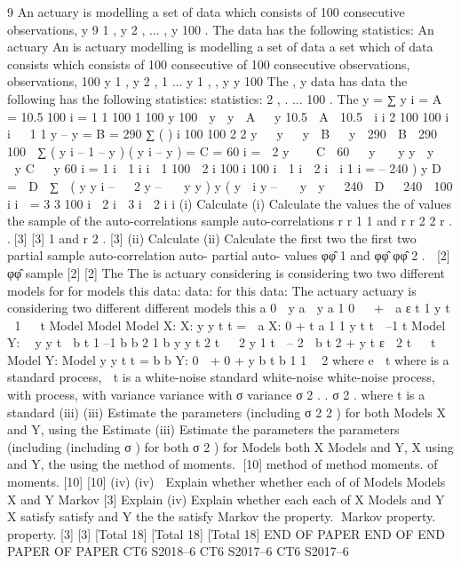 \documentclass[a4paper,12pt]{article}
\begin{document}
\begin{enumerate}
9
An actuary is modelling a set of data which consists of 100 consecutive observations,
y 9 1 , y 2 , ... , y 100 . The data has the following statistics:
An actuary
An is
actuary
modelling is modelling
a set of data
a set which of data consists
which consists of 100 consecutive
of 100 consecutive
observations,
observations,
100
y 1 , y 2 , 1 ... y 1 , , y y 100
The
, y data
has data
the following
has the following
statistics: statistics:
2 , . ...
100 . The
y =
∑ y i = A = 10.5
100 i = 1
1 100 1 100
y 100

y  y 
A 
 y 10.5

A  10.5

i
i
2 100
100
i
i


1
1
y – y = B = 290
∑ (
)
i
100
100 2
2
y  
y   y  B
 
y  290
 B  290

100 
∑ ( y i – 1 – y ) ( y i – y ) = C = 60
i =  2 y 
  C  60

 y   y y  y    y C   y 60
i = 1
i  1
i
i  1
100
 2
i 100
i
100
i  1
i  2
i  i 1
i
= – 240
) y D =  D 
∑  ( y y i –   2 y –   y y ) y ( y  i y –   y 
y   240

D 
 240

100
i i  = 3 3
100
i  2
i  3
i  2 i
i
(i) Calculate
(i)
Calculate
the values
the of values
the sample
of the auto-correlations
sample auto-correlations
r r 1 1 and r r 2 2 r . .[3]
[3]
1 and r 2 . [3]
(ii) Calculate
(ii)
Calculate the first two
the first two partial sample auto-correlation
auto-
partial auto- values φφ̂ 1 and φφ̂ φφ̂ 2 .  [2]
φφ̂
sample
[2] [2]
The
The is
actuary
considering
is considering two
two different models for
for models
this data:
data:
for this data:
The actuary
actuary
is
considering
two different
different
models
this
a 0 
y a 
y a 1 0   +  a ε t 1 y t  1   t
Model
Model
Model X:
X:
y y t t = 
a X:
0 + t a 1 1 y t t  –1
t
Model Y:

y y t  b t 1 –1
b b 2 1 b y y t 2 t   2 y 1 t  – 2  b t 2 + y t ε  2 t   t
Model
Y:
Model
y y t t =
b b Y:
0  +
0 + y b t b 1 1 
2
where e  t where
is a standard
process,
 t is a white-noise
standard
white-noise
white-noise
process, with
process,
with variance
variance
with σ
variance
σ 2 . .
σ 2 .
where
t is a standard
(iii)
(iii) Estimate the parameters (including σ 2 2 ) for both
Models X and Y, using the
Estimate
(iii) Estimate
the parameters
the parameters
(including
(including
σ ) for both
σ 2 ) for
Models
both X
Models
and Y, X using
and Y,
the using the
method of moments.
[10]
method of
method
moments.
of moments.
[10]
[10]
(iv)
(iv)
 Explain
whether whether
each of
of Models
Models
X
and Y
Markov
[3]
Explain
(iv)
Explain
whether
each
each of X
Models
and
Y X satisfy
satisfy
and Y the
the
satisfy
Markov
the property.
Markov
property. property.
[3]
[3]
[Total
18]
[Total 18]
[Total 18]
END OF PAPER
END OF
END
PAPER
OF PAPER
CT6 S2018–6
CT6 S2017–6
CT6 S2017–6


\end{enumerate}
\end{document}

